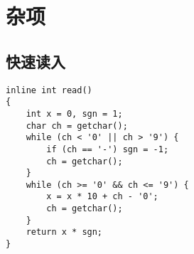 \documentclass[a4paper, 10pt]{paper}
\begin{document}
    \section{杂项}
        \subsection{快速读入}
        \begin{verbatim}
inline int read()
{
    int x = 0, sgn = 1;
    char ch = getchar();
    while (ch < '0' || ch > '9') {
        if (ch == '-') sgn = -1;
        ch = getchar();
    }
    while (ch >= '0' && ch <= '9') {
        x = x * 10 + ch - '0';
        ch = getchar();
    }
    return x * sgn;
}
        \end{verbatim}
\end{document}
